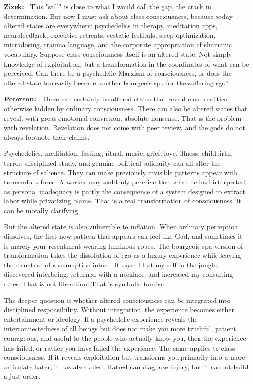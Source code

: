 \documentclass[a4paper,11pt]{article}
\newenvironment{question}{\par\noindent\color{ALIUSRed}\textbf{Zizek:}\ }{\par}
\newenvironment{answer}{\par\noindent\color{black}\textbf{Peterson:}\ }{\par}
\begin{document}
\begin{question}
This "still" is close to what I would call the gap, the crack in determination. But now I must ask about class consciousness, because today altered states are everywhere: psychedelics in therapy, meditation apps, neurofeedback, executive retreats, ecstatic festivals, sleep optimization, microdosing, trauma language, and the corporate appropriation of shamanic vocabulary. Suppose class consciousness itself is an altered state. Not simply knowledge of exploitation, but a transformation in the coordinates of what can be perceived. Can there be a psychedelic Marxism of consciousness, or does the altered state too easily become another bourgeois spa for the suffering ego?
\end{question}

\begin{answer}
There can certainly be altered states that reveal class realities otherwise hidden by ordinary consciousness. There can also be altered states that reveal, with great emotional conviction, absolute nonsense. That is the problem with revelation. Revelation does not come with peer review, and the gods do not always footnote their claims.

Psychedelics, meditation, fasting, ritual, music, grief, love, illness, childbirth, terror, disciplined study, and genuine political solidarity can all alter the structure of salience. They can make previously invisible patterns appear with tremendous force. A worker may suddenly perceive that what he had interpreted as personal inadequacy is partly the consequence of a system designed to extract labor while privatizing blame. That is a real transformation of consciousness. It can be morally clarifying.

But the altered state is also vulnerable to inflation. When ordinary perception dissolves, the first new pattern that appears can feel like God, and sometimes it is merely your resentment wearing luminous robes. The bourgeois spa version of transformation takes the dissolution of ego as a luxury experience while leaving the structure of consumption intact. It says: I lost my self in the jungle, discovered interbeing, returned with a necklace, and increased my consulting rates. That is not liberation. That is symbolic tourism.

The deeper question is whether altered consciousness can be integrated into disciplined responsibility. Without integration, the experience becomes either entertainment or ideology. If a psychedelic experience reveals the interconnectedness of all beings but does not make you more truthful, patient, courageous, and useful to the people who actually know you, then the experience has failed, or rather you have failed the experience. The same applies to class consciousness. If it reveals exploitation but transforms you primarily into a more articulate hater, it has also failed. Hatred can diagnose injury, but it cannot build a just order.


\end{answer}
\end{document}
